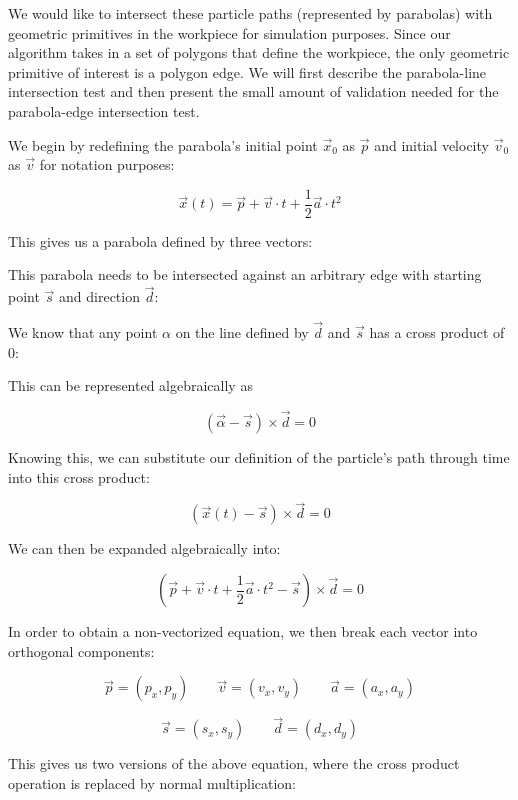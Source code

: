 We would like to intersect these particle paths (represented by parabolas) with geometric primitives in the workpiece for simulation purposes. Since our algorithm takes in a set of polygons that define the workpiece, the only geometric primitive of interest is a polygon edge. We will first describe the parabola-line intersection test and then present the small amount of validation needed for the parabola-edge intersection test.

We begin by redefining the parabola's initial point $\vec{x}_0$ as $\vec{p}$ and initial velocity $\vec{v}_0$ as $\vec{v}$ for notation purposes:

$$
\vec{x}(t) = \vec{p} + \vec{v} \cdot t + \frac{1}{2} \vec{a} \cdot t^2
$$

This gives us a parabola defined by three vectors:


This parabola needs to be intersected against an arbitrary edge with starting point $\vec{s}$ and direction $\vec{d}$:


We know that any point $\alpha$ on the line defined by $\vec{d}$ and $\vec{s}$ has a cross product of 0:


This can be represented algebraically as

$$
(\vec{\alpha} - \vec{s}) \times \vec{d} = 0
$$

Knowing this, we can substitute our definition of the particle's path through time into this cross product:

$$
(\vec{x}(t) - \vec{s}) \times \vec{d} = 0
$$

We can then be expanded algebraically into:

$$
(\vec{p} + \vec{v} \cdot t + \frac{1}{2} \vec{a} \cdot t^2 - \vec{s}) \times \vec{d} = 0
$$

In order to obtain a non-vectorized equation, we then break each vector into orthogonal components:

$$
\vec{p} = (p_x, p_y) \qquad \vec{v} = (v_x, v_y) \qquad \vec{a} = (a_x, a_y)
$$

$$
\vec{s} = (s_x, s_y) \qquad \vec{d} = (d_x, d_y)
$$

This gives us two versions of the above equation, where the cross product operation is replaced by normal multiplication:

